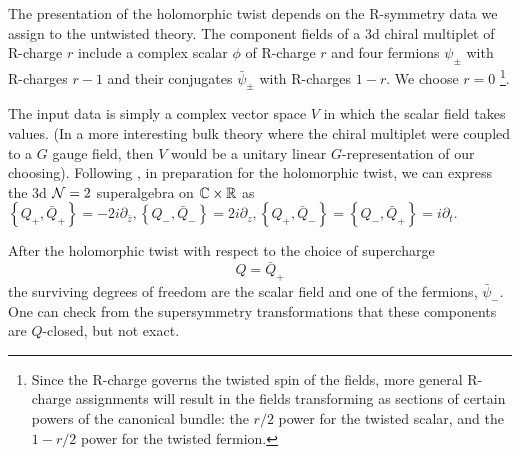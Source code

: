 \documentclass[11pt]{amsart}
\def\brian#1{{\textcolor{blue!65!red}{BRW: {#1}}}}
\begin{document}
The presentation of the holomorphic twist depends on the R-symmetry data we assign to the untwisted theory. 
The component fields of a 3d chiral multiplet of R-charge $r$ include a complex scalar $\phi$ of R-charge $r$ and four fermions $\psi_{\pm}$ with R-charges  $r-1$ and their conjugates $\bar{\psi}_{\pm}$ with R-charges $1-r$. We choose $r=0$ \footnote{Since the R-charge governs the twisted spin of the fields, more general R-charge assignments will result in the fields transforming as sections of certain powers of the canonical bundle: the $r/2$ power for the twisted scalar, and the $1-r/2$ power for the twisted fermion.}.  

The input data is simply a complex vector space $V$ in which the scalar field takes values. (In a more interesting bulk theory where the chiral multiplet were coupled to a $G$ gauge field, then $V$ would be a unitary linear $G$-representation of our choosing). Following \cite{DGP, CDG}, in preparation for the holomorphic twist, we can express the 3d $\mathcal N=2$ superalgebra on $\mathbb C \times \mathbb R$ as $\left\lbrace Q_+, \bar{Q}_+ \right\rbrace = -2 i \partial_{\bar{z}}, \left\lbrace Q_-, \bar{Q}_- \right\rbrace = 2 i \partial_{z}, \left\lbrace Q_+, \bar{Q}_- \right\rbrace = \left\lbrace Q_-, \bar{Q}_+ \right\rbrace = i \partial_t.$


After the holomorphic twist with respect to the choice of supercharge 
\[
Q = \bar{Q}_+ 
\]
the surviving degrees of freedom are the scalar field and one of the fermions, $\bar{\psi}_-$. 
One can check from the supersymmetry transformations that these components are $Q$-closed, but not exact. 
\end{document}

